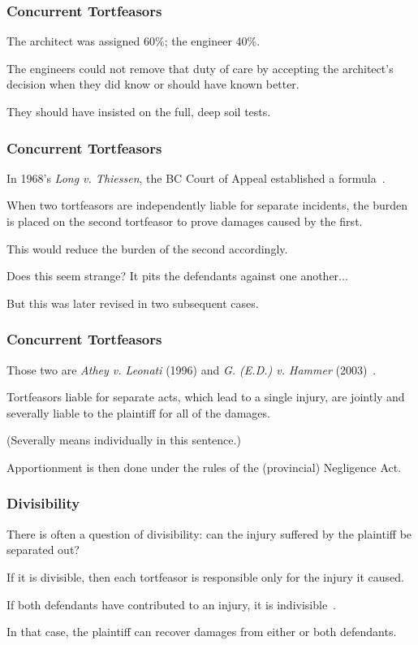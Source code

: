 \begin{frame}
\frametitle{Concurrent Tortfeasors}

The architect was assigned 60\%; the engineer 40\%.

The engineers could not remove that duty of care by accepting the architect's decision when they did know or should have known better.

They should have insisted on the full, deep soil tests.

\end{frame}



\begin{frame}
\frametitle{Concurrent Tortfeasors}

In 1968's \textit{Long v. Thiessen}, the BC Court of Appeal established a formula~\cite{ct}.

When two tortfeasors are independently liable for separate incidents, the burden is placed on the second tortfeasor to prove damages caused by the first.

This would reduce the burden of the second accordingly.

Does this seem strange? It pits the defendants against one another...

But this was later revised in two subsequent cases.

\end{frame}



\begin{frame}
\frametitle{Concurrent Tortfeasors}

Those two are \textit{Athey v. Leonati} (1996) and \textit{G. (E.D.) v. Hammer} (2003)~\cite{ct}.

Tortfeasors liable for separate acts, which lead to a single injury, are jointly and severally liable to the plaintiff for all of the damages.

(Severally means individually in this sentence.)

Apportionment is then done under the rules of the (provincial) Negligence Act.

\end{frame}



\begin{frame}
\frametitle{Divisibility}

There is often a question of \alert{divisibility}: can the injury suffered by the plaintiff be separated out?

If it is divisible, then each tortfeasor is responsible only for the injury it caused.

If both defendants have contributed to an injury, it is indivisible~\cite{ct}.

In that case, the plaintiff can recover damages from either or both defendants.

\end{frame}




